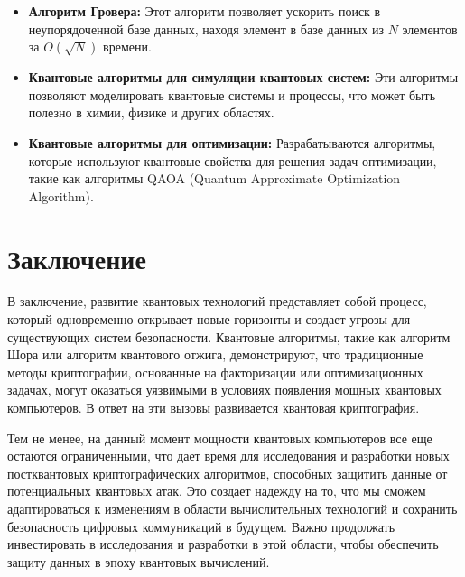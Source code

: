 \documentclass[12pt]{article}
\begin{document}
\begin{itemize}
    \item \textbf{Алгоритм Гровера:} Этот алгоритм позволяет ускорить поиск в неупорядоченной базе данных, находя элемент в базе данных из $N$ элементов за $O(\sqrt{N})$ времени.
    
    \item \textbf{Квантовые алгоритмы для симуляции квантовых систем:} Эти алгоритмы позволяют моделировать квантовые системы и процессы, что может быть полезно в химии, физике и других областях.
    
    \item \textbf{Квантовые алгоритмы для оптимизации:} Разрабатываются алгоритмы, которые используют квантовые свойства для решения задач оптимизации, такие как алгоритмы QAOA (Quantum Approximate Optimization Algorithm).
\end{itemize}

\newpage

\section{Заключение}

В заключение, развитие квантовых технологий представляет собой процесс, который одновременно открывает новые горизонты и создает угрозы для существующих систем безопасности. Квантовые алгоритмы, такие как алгоритм Шора или алгоритм квантового отжига, демонстрируют, что традиционные методы криптографии, основанные на факторизации или оптимизационных задачах, могут оказаться уязвимыми в условиях появления мощных квантовых компьютеров. В ответ на эти вызовы развивается квантовая криптография.

Тем не менее, на данный момент мощности квантовых компьютеров все еще остаются ограниченными, что дает время для исследования и разработки новых постквантовых криптографических алгоритмов, способных защитить данные от потенциальных квантовых атак. Это создает надежду на то, что мы сможем адаптироваться к изменениям в области вычислительных технологий и сохранить безопасность цифровых коммуникаций в будущем. Важно продолжать инвестировать в исследования и разработки в этой области, чтобы обеспечить защиту данных в эпоху квантовых вычислений. 
\end{document}
